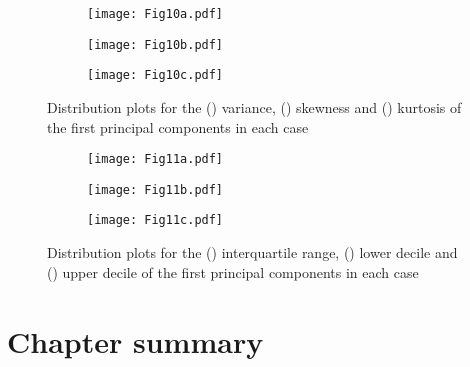 \begin{figure}
    \centering
    \begin{subfigure}{\imgwidth}
        \texttt{[image: Fig10a.pdf]}%
        \caption{}\label{fig:edo_variance}
    \end{subfigure}

    \begin{subfigure}{\imgwidth}
        \texttt{[image: Fig10b.pdf]}%
    \caption{}\label{fig:edo_skewness}
    \end{subfigure}

    \begin{subfigure}{\imgwidth}
        \texttt{[image: Fig10c.pdf]}%
        \caption{}\label{fig:edo_kurtosis}
    \end{subfigure}
    \caption{Distribution plots for the () variance,
        () skewness and ()
        kurtosis of the first principal components in each
        case}\label{fig:edo_moments}
\end{figure}

\begin{figure}
    \centering
    \begin{subfigure}{\imgwidth}
        \texttt{[image: Fig11a.pdf]}
        \caption{}\label{fig:edo_iqr}
    \end{subfigure}\vfill%

    \begin{subfigure}{\imgwidth}
        \texttt{[image: Fig11b.pdf]}
        \caption{}\label{fig:edo_lower}
    \end{subfigure}\vfill%

    \begin{subfigure}{\imgwidth}
        \texttt{[image: Fig11c.pdf]}
        \caption{}\label{fig:edo_upper}
    \end{subfigure}
    \caption{Distribution plots for the () interquartile
        range, () lower decile and
        () upper decile of the first principal components
        in each case}\label{fig:edo_quantiles}
\end{figure}


\section{Chapter summary}\label{sec:kmodes:summary}

